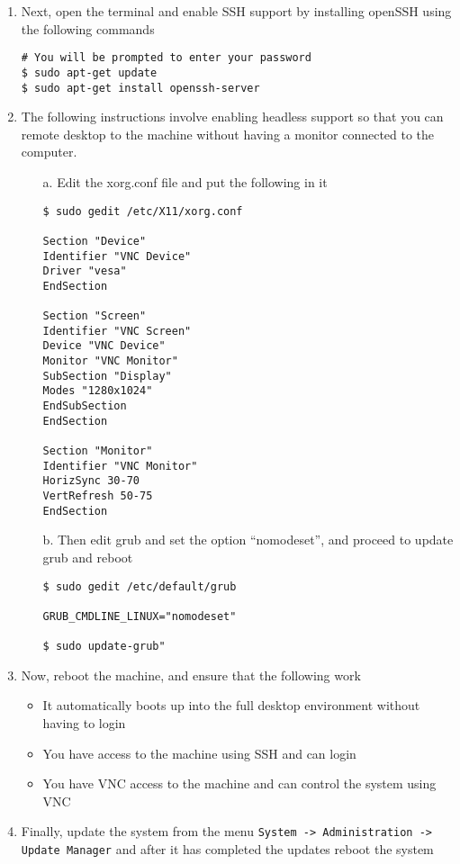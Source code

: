 \begin{enumerate}
\item	Next, open the terminal and enable SSH support by installing openSSH using the following commands

\lstset{}
\begin{lstlisting}
# You will be prompted to enter your password
$ sudo apt-get update
$ sudo apt-get install openssh-server
\end{lstlisting}

\item 	The following instructions involve enabling headless support so that you can remote desktop to the machine without having a 
		monitor connected to the computer.
\begin{itemize}
\item[a.] Edit the xorg.conf file and put the following in it

\lstset{language=bash,caption=Configuring Xorg for Headless Support}
\begin{lstlisting}
$ sudo gedit /etc/X11/xorg.conf

Section "Device"
Identifier "VNC Device"
Driver "vesa"
EndSection

Section "Screen"
Identifier "VNC Screen"
Device "VNC Device"
Monitor "VNC Monitor"
SubSection "Display"
Modes "1280x1024"
EndSubSection
EndSection

Section "Monitor"
Identifier "VNC Monitor"
HorizSync 30-70
VertRefresh 50-75
EndSection
\end{lstlisting}
	
\item[b.] Then edit grub and set the option ``nomodeset'', and proceed to update grub and reboot

\lstset{language=bash,caption=Configuring Grub for Headless Support}
\begin{lstlisting}
$ sudo gedit /etc/default/grub

GRUB_CMDLINE_LINUX="nomodeset"

$ sudo update-grub"
\end{lstlisting}
\end{itemize}

\item	Now, reboot the machine, and ensure that the following work
\begin{itemize}
\item	It automatically boots up into the full desktop environment without having to login
\item	You have access to the machine using SSH and can login
\item	You have VNC access to the machine and can control the system using VNC	
\end{itemize}

\item	Finally, update the system from the menu \verb|System -> Administration -> Update Manager| and after it has 
		completed the updates reboot the system
\end{enumerate}


